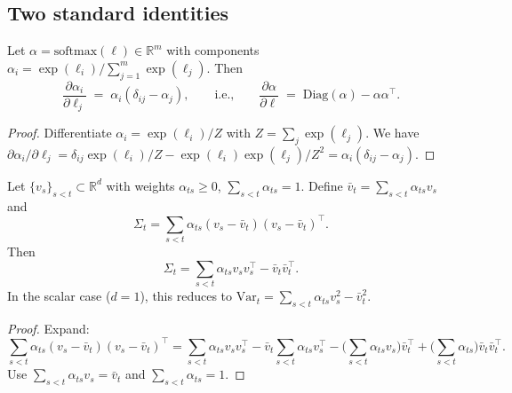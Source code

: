 \documentclass[11pt]{article}
\begin{document}
\subsection{Two standard identities}
\label{app:lemmas_standard}

\begin{lemma}
\label{lem:softmax_jacobian}
Let $\alpha=\mathrm{softmax}(\ell)\in\mathbb{R}^m$ with components
$\alpha_i=\exp(\ell_i)/\sum_{j=1}^m \exp(\ell_j)$. Then
\begin{equation}
\frac{\partial \alpha_i}{\partial \ell_j}
\;=\;
\alpha_i(\delta_{ij}-\alpha_j),
\qquad\text{i.e.,}\qquad
\frac{\partial \alpha}{\partial \ell}
\;=\;
\mathrm{Diag}(\alpha)-\alpha\alpha^\top.
\label{eq:softmax_jacobian}
\end{equation}
\end{lemma}

\begin{proof}
Differentiate $\alpha_i=\exp(\ell_i)/Z$ with $Z=\sum_j\exp(\ell_j)$.
We have $\partial \alpha_i/\partial \ell_j = \delta_{ij}\exp(\ell_i)/Z - \exp(\ell_i)\exp(\ell_j)/Z^2
= \alpha_i(\delta_{ij}-\alpha_j)$.
\end{proof}

\begin{lemma}
\label{lem:cov_identity}
Let $\{v_s\}_{s<t}\subset \mathbb{R}^d$ with weights $\alpha_{ts}\ge 0$, $\sum_{s<t}\alpha_{ts}=1$.
Define $\bar v_t=\sum_{s<t}\alpha_{ts}v_s$ and
\[
\Sigma_t=\sum_{s<t}\alpha_{ts}(v_s-\bar v_t)(v_s-\bar v_t)^\top.
\]
Then
\begin{equation}
\Sigma_t
=
\sum_{s<t}\alpha_{ts} v_s v_s^\top - \bar v_t \bar v_t^\top.
\label{eq:cov_identity}
\end{equation}
In the scalar case ($d=1$), this reduces to
$\mathrm{Var}_t=\sum_{s<t}\alpha_{ts}v_s^2-\bar v_t^2$.
\end{lemma}

\begin{proof}
Expand:
\[
\sum_{s<t}\alpha_{ts}(v_s-\bar v_t)(v_s-\bar v_t)^\top
=
\sum_{s<t}\alpha_{ts}v_s v_s^\top
-\bar v_t\sum_{s<t}\alpha_{ts}v_s^\top
-\Big(\sum_{s<t}\alpha_{ts}v_s\Big)\bar v_t^\top
+\Big(\sum_{s<t}\alpha_{ts}\Big)\bar v_t\bar v_t^\top.
\]
Use $\sum_{s<t}\alpha_{ts}v_s=\bar v_t$ and $\sum_{s<t}\alpha_{ts}=1$.
\end{proof}

\end{document}
